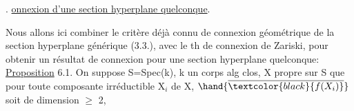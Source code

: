 


%
%

%






%




%



. \uline{onnexion d'une section hyperplane quelconque}.

Nous allons ici combiner le critère déjà connu de connexion
géométrique de la section hyperplane générique  (3.3.), avec le
th de connexion de Zariski, pour obtenir un résultat de connexion pour
une section hyperplane quelconque:
\uline{Proposition} 6.1.  On suppose S=Spec(k), k un corps alg clos, X propre sur S 
que pour toute composante irréductible X$_{i}$ de X,  $\hand{\overline{\textcolor{black}{f(X_{i})}}}$ soit de
dimension $\geqslant$ 2,  

